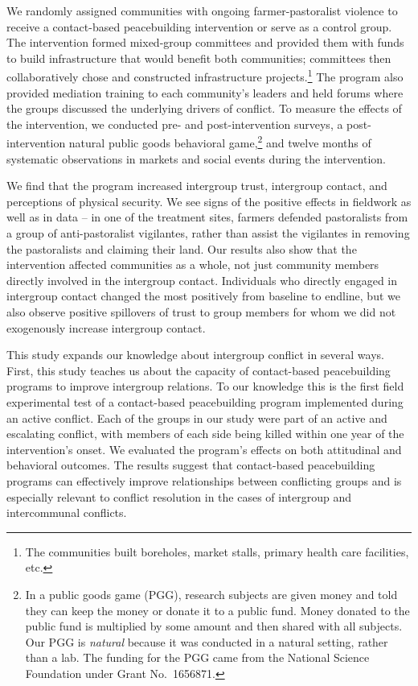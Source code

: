 \documentclass[11pt]{article}
\begin{document}
We randomly assigned communities with ongoing farmer-pastoralist
violence to receive a contact-based peacebuilding intervention or serve
as a control group. The intervention formed mixed-group committees and
provided them with funds to build infrastructure that would benefit both
communities; committees then collaboratively chose and constructed
infrastructure projects.\footnote{The communities built boreholes,
  market stalls, primary health care facilities, etc.} The program also
provided mediation training to each community's leaders and held forums
where the groups discussed the underlying drivers of conflict. To
measure the effects of the intervention, we conducted pre- and
post-intervention surveys, a post-intervention natural public goods
behavioral game,\footnote{In a public goods game (PGG), research
  subjects are given money and told they can keep the money or donate it
  to a public fund. Money donated to the public fund is multiplied by
  some amount and then shared with all subjects. Our PGG is
  \emph{natural} because it was conducted in a natural setting, rather
  than a lab. The funding for the PGG came from the National Science
  Foundation under Grant No.~1656871.} and twelve months of systematic
observations in markets and social events during the intervention.

We find that the program increased intergroup trust, intergroup contact,
and perceptions of physical security. We see signs of the positive
effects in fieldwork as well as in data -- in one of the treatment
sites, farmers defended pastoralists from a group of anti-pastoralist
vigilantes, rather than assist the vigilantes in removing the
pastoralists and claiming their land. Our results also show that the
intervention affected communities as a whole, not just community members
directly involved in the intergroup contact. Individuals who directly
engaged in intergroup contact changed the most positively from baseline
to endline, but we also observe positive spillovers of trust to group
members for whom we did not exogenously increase intergroup contact.

This study expands our knowledge about intergroup conflict in several
ways. First, this study teaches us about the capacity of contact-based
peacebuilding programs to improve intergroup relations. To our knowledge
this is the first field experimental test of a contact-based
peacebuilding program implemented during an active conflict. Each of the
groups in our study were part of an active and escalating conflict, with
members of each side being killed within one year of the intervention's
onset. We evaluated the program's effects on both attitudinal and
behavioral outcomes. The results suggest that contact-based
peacebuilding programs can effectively improve relationships between
conflicting groups and is especially relevant to conflict resolution in
the cases of intergroup and intercommunal conflicts.
\end{document}
